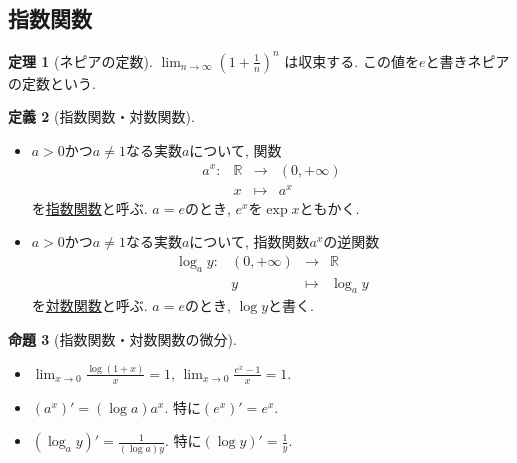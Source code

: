 \documentclass[dvipdfmx,a4paper,11pt]{article}
\newcommand{\R}{\mathbb{R}}
\theoremstyle{definition}
\newtheorem{thm}{定理}
\newtheorem{prop}[thm]{命題}
\newtheorem{dfn}[thm]{定義}
\begin{document}
 \subsection{指数関数}
 
 \begin{tcolorbox}[
    colback = white,
    colframe = green!35!black,
    fonttitle = \bfseries,
    breakable = true]
    \begin{thm}[ネピアの定数]
$
\lim_{n \rightarrow \infty} \left(1 + \frac{1}{n}\right)^n
$
は収束する. この値を$e$と書きネピアの定数という.
\end{thm}
  \end{tcolorbox} 
  
 \begin{tcolorbox}[
    colback = white,
    colframe = green!35!black,
    fonttitle = \bfseries,
    breakable = true]
    \begin{dfn}[指数関数・対数関数]
    \text{}
 \begin{itemize}
\item $a>0$かつ$a \neq 1$なる実数$a$について, 関数
$$
\begin{array}{cccc}
a^x: &\R& \rightarrow & (0, + \infty)  \\
&x& \longmapsto & a^x
\end{array}
$$
を\underline{指数関数}と呼ぶ.
$a=e$のとき, $e^x$を$\exp x$ともかく.
\item $a>0$かつ$a \neq 1$なる実数$a$について, 指数関数$a^x$の逆関数
$$
\begin{array}{cccc}
\log_{a} y: &(0, + \infty) & \rightarrow & \R \\
&y& \longmapsto & \log_{a} y
\end{array}
$$
を\underline{対数関数}と呼ぶ.
$a=e$のとき, $\log y$と書く.
 \end{itemize}
 \end{dfn}
   \end{tcolorbox}
   
    \begin{tcolorbox}[
    colback = white,
    colframe = green!35!black,
    fonttitle = \bfseries,
    breakable = true]
    \begin{prop}[指数関数・対数関数の微分]
    \text{}
 \begin{itemize}
 \item  $\lim_{x \rightarrow 0} \frac{\log (1+x)}{x} =1$, $\lim_{x \rightarrow 0} \frac{e^x -1}{x} =1$.
 \item  $(a^x)' = (\log a) a^x$. 特に$(e^x)' = e^x$.
  \item  $(\log_{a} y)' = \frac{1}{(\log a) y}$. 特に$(\log y)' = \frac{1}{y}$.
 \end{itemize}
 \end{prop}
   \end{tcolorbox}
\end{document}
